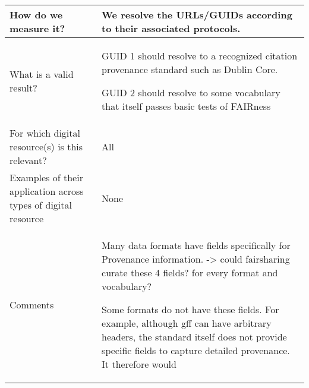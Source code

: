 \documentclass[english]{article}
\begin{document}
\begin{longtable}{|p{5cm}|p{9cm}|}
\\



\hline
How do we measure it? &  


We resolve the URLs/GUIDs according to their associated protocols. 


\\



\hline
What is a valid result? &  


GUID 1 should resolve to a recognized citation provenance standard such as Dublin Core.\newline 

GUID 2 should resolve to some vocabulary that itself passes basic tests of FAIRness\newline


\\



\hline
For which digital resource(s) is this relevant? &  All\\



\hline
Examples of their application across types of digital resource &  None

\\



\hline

Comments & 


Many data formats have fields specifically for Provenance information.  -> could fairsharing curate these 4 fields? for every format and vocabulary? \newline

Some formats do not have these fields.  For example, although gff can have arbitrary headers, the standard itself does not provide specific fields to capture detailed provenance. It therefore would 




\\
\hline

\end{longtable}




\newpage
\end{document}
